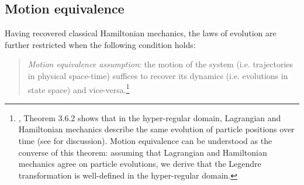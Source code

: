\documentclass[letterpaper]{article}
\begin{document}
\subsection{Motion equivalence}
\label{motion}

Having recovered classical Hamiltonian mechanics, the laws of evolution are further restricted when the following condition holds:

\begin{quotation}
\noindent
\textit{Motion equivalence assumption}: the motion of the system (i.e. trajectories in physical space-time) suffices to recover its dynamics (i.e. evolutions in state space) and vice-versa.\footnote{ \textcites[]{Abraham1978}, Theorem 3.6.2 shows that in the hyper-regular domain, Lagrangian and Hamiltonian mechanics describe the same evolution of particle positions over time (see \textcites[1180-1181]{Barrett2} for discussion). Motion equivalence can be understood as the converse of this theorem: assuming that Lagrangian and Hamiltonian mechanics agree on particle evolutions, we derive that the Legendre transformation is well-defined in the hyper-regular domain.}
\end{quotation}
\end{document}
